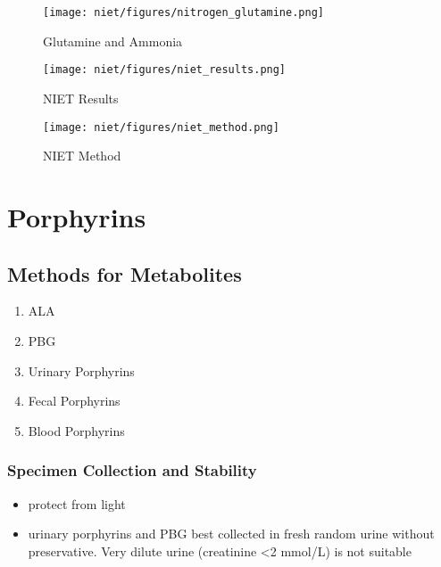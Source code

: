 \documentclass[12pt]{scrartcl}
\begin{document}
\begin{figure}[htbp]
\centering
\texttt{[image: niet/figures/nitrogen\_glutamine.png]}
\caption[gln]{\label{fig:orgcee2bc4}Glutamine and Ammonia}
\end{figure}

\begin{figure}[htbp]
\centering
\texttt{[image: niet/figures/niet\_results.png]}
\caption[interp]{\label{fig:orgc7dbaf3}NIET Results}
\end{figure}


\begin{figure}[htbp]
\centering
\texttt{[image: niet/figures/niet\_method.png]}
\caption{\label{fig:orga528d4f}NIET Method}
\end{figure}
\section{Porphyrins}
\label{sec:org5d32cf6}
\subsection{Methods for Metabolites}
\label{sec:org1781bff}
\begin{enumerate}
\item ALA
\item PBG
\item Urinary Porphyrins
\item Fecal Porphyrins
\item Blood Porphyrins
\end{enumerate}
\subsubsection{Specimen Collection and Stability}
\label{sec:org7f81297}
\begin{itemize}
\item protect from light
\item urinary porphyrins and PBG best collected in fresh random urine
without preservative. Very dilute urine (creatinine <2 mmol/L) is
not suitable
\end{itemize}
\end{document}
